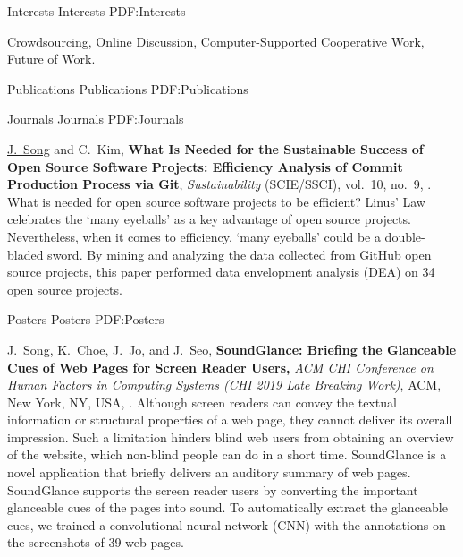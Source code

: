 \documentclass[letterpaper,MMMyyyy,nonstopmode]{template}
\begin{document}
\begin{Body}
\begin{Detail}
\end{Detail}

    
\BigGap
\Section
{Interests}
{Interests}
{PDF:Interests}

\Entry
Crowdsourcing,
Online Discussion,
Computer-Supported Cooperative Work,
Future of Work.


\BigGap
\Section
{Publications}
{Publications}
{PDF:Publications}

\SubSection
{Journals}
{Journals}
{PDF:Journals}

\begingroup
\renewcommand{\MaxNumberedItem}{[88]}

\BigGap
\NumberedItem{[1]}
  \href{https://doi.org/10.3390/su10093001}
  \underline{J.~Song} and C.~Kim,
  \textbf{What Is Needed for the Sustainable Success of Open Source Software Projects: Efficiency Analysis of Commit Production Process via Git},
  \textit{Sustainability} (SCIE/SSCI),
  vol.~10,
  no.~9,
  .
  \vspace{2mm}\newline
  {\small{
    What is needed for open source software projects to be efficient? Linus' Law celebrates the `many eyeballs' as a key advantage of open source projects. 
    Nevertheless, when it comes to efficiency, `many eyeballs' could be a double-bladed sword. By mining and analyzing the data collected from GitHub open source projects, this paper performed data envelopment analysis (DEA) on 34 open source projects.
  }}

\endgroup

\BigGap
\SubSection
{Posters}
{Posters}
{PDF:Posters}

\begingroup
\renewcommand{\MaxNumberedItem}{[88]}

\BigGap
\NumberedItem{[2]}
  \href{https://doi.org/10.1145/3290607.3312865}
  \underline{J.~Song}, K.~Choe, J.~Jo, and J.~Seo,
  \textbf{SoundGlance: Briefing the Glanceable Cues of Web Pages for Screen Reader Users,}
  \textit{ACM CHI Conference on Human Factors in Computing Systems (CHI 2019 Late Breaking Work)},
  ACM, New York, NY, USA,
  .
  \vspace{2mm}\newline
  {\small{
    Although screen readers can convey the textual information or structural properties of a web page, they cannot deliver its overall impression. Such a limitation hinders blind web users from obtaining an overview of the website, which non-blind people can do in a short time. 
    SoundGlance is a novel application that briefly delivers an auditory summary of web pages. SoundGlance supports the screen reader users by converting the important glanceable cues of the pages into sound.
    To automatically extract the glanceable cues, we trained a convolutional neural network (CNN) with the annotations on the screenshots of 39 web pages.
  }}


\end{Body}
\end{document}
